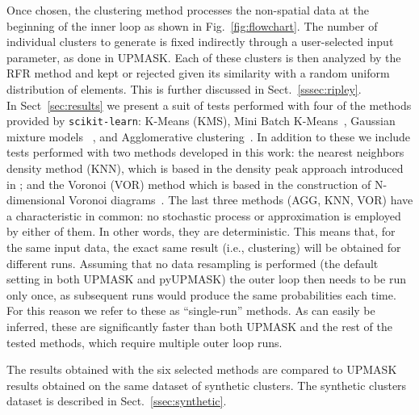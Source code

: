 \documentclass{aa}
\begin{document}
 Once chosen, the clustering method processes the non-spatial data at the
 beginning of the inner loop as shown in Fig.~\ref{fig:flowchart}. The number
 of individual clusters to generate is fixed indirectly through a
 user-selected input parameter, as done in UPMASK.
 Each of these clusters is then analyzed by the RFR method and kept or
 rejected given its similarity with a random uniform distribution of elements.
 This is further discussed in Sect.~\ref{sssec:ripley}.\\

 In Sect~\ref{sec:results} we present a suit of tests performed with
 four of the methods provided by \texttt{scikit-learn}: K-Means (KMS), Mini
 Batch K-Means~\citep[MBK,][]{Sculley2010}, Gaussian mixture models~
 \citep[GMM,][]{Baxter2010}, and Agglomerative
 clustering~\citep[AGG,][]{Zepeda2013}.
 In addition to these we include tests performed with two methods developed in
 this work: the nearest neighbors density method (KNN), which is based in the
 density peak approach introduced in \cite{Rodriguez2014}; and the 
 Voronoi (VOR) method which is based in the construction of N-dimensional
 Voronoi diagrams~\citep{Voronoi_1908}.
 The last three methods (AGG, KNN, VOR) have a characteristic in common:
 no stochastic process or approximation is employed by either of them. In
 other words, they are deterministic.
 This means that, for the same input data, the exact same result (i.e.,
 clustering) will be obtained for different runs.
 Assuming that no data resampling is performed (the default setting in both
 UPMASK and pyUPMASK) the outer loop then needs to be run only once, as
 subsequent runs would produce the same probabilities each time. For this
 reason we refer to these as ``single-run'' methods. As can easily be
 inferred, these are significantly faster than both UPMASK and the rest of the
 tested methods, which require multiple outer loop runs.

 The results obtained with the six selected methods are compared to UPMASK
 results obtained on the same dataset of synthetic clusters. The synthetic
 clusters dataset is described in  Sect.~\ref{ssec:synthetic}.
\end{document}
